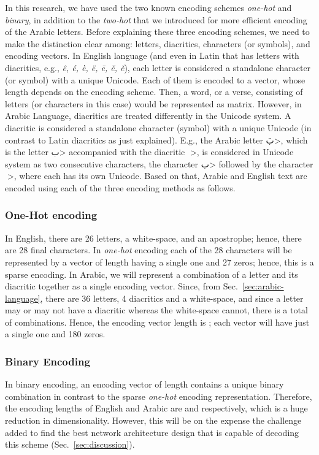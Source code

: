 \documentclass[journal,10pt,twocolumns,letter]{IEEEtran}
\begin{document}
In this research, we have used the two known encoding schemes \textit{one-hot} and \textit{binary},
in addition to the \textit{two-hot} that we introduced for more efficient encoding of the Arabic
letters. Before explaining these three encoding schemes, we need to make the distinction clear
among: letters, diacritics, characters (or symbols), and encoding vectors. In English language (and
even in Latin that has letters with diacritics, e.g., \textit{ê, é, è, ë, ē, ĕ, ě}), each letter is
considered a standalone character (or symbol) with a unique Unicode. Each of them is encoded to a
vector, whose length  depends on the encoding scheme. Then, a word, or a verse, consisting of 
letters (or characters in this case) would be represented as  matrix. However, in Arabic
Language, diacritics are treated differently in the Unicode system. A diacritic is considered a
standalone character (symbol) with a unique Unicode (in contrast to Latin diacritics as just
explained). E.g., the Arabic letter \<بَ>, which is the letter \<ب> accompanied
with the diacritic \<◌َ>, is considered in Unicode system as two consecutive characters,
the character \<ب> followed by the character \<◌َ>, where each has its own
Unicode. Based on that, Arabic and English text are encoded using each of the three encoding methods
as follows.

\bigskip

\subsubsection{One-Hot encoding}\label{sec:one-hot-encoding}
In English, there are 26 letters, a white-space, and an apostrophe; hence, there are 28 final
characters. In \textit{one-hot} encoding each of the 28 characters will be represented by a vector
of length  having a single one and 27 zeros; hence, this is a sparse encoding. In Arabic, we
will represent a combination of a letter and its diacritic together as a single encoding
vector. Since, from Sec.~\ref{sec:arabic-language}, there are 36 letters, 4 diacritics and a
white-space, and since a letter may or may not have a diacritic whereas the white-space cannot,
there is a total of  combinations. Hence, the encoding vector length is
; each vector will have just a single one and 180 zeros.


\subsubsection{Binary Encoding}\label{sec:binary-encoding}
In binary encoding, an encoding vector of length  contains a unique binary combination in
contrast to the sparse \textit{one-hot} encoding representation. Therefore, the encoding lengths of
English and Arabic are  and  respectively, which is a
huge reduction in dimensionality. However, this will be on the expense the challenge added to find
the best network architecture design that is capable of decoding this scheme
(Sec.~\ref{sec:discussion}).
\end{document}
